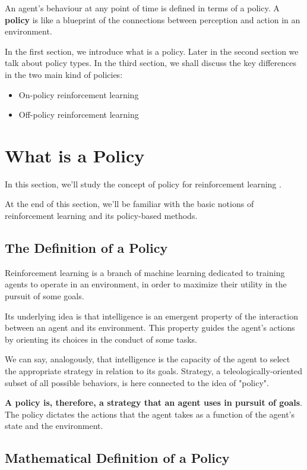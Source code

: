 An agent's behaviour at any point of time is defined in terms 
of a policy. A {\bf policy} is like a blueprint of the connections 
between perception and action in an environment.  

In the first section, we introduce what is a policy.
Later in the second section we talk about policy types.
In the third section, we shall discuss the key differences 
in the two main kind of policies: 
\begin{itemize}
\item On-policy reinforcement learning
\item Off-policy reinforcement learning
\end{itemize}

\section{What is a Policy}

In this section, we'll study the concept of policy for 
reinforcement learning\cite{Gabriele2020}
\parencite{Gabriele2020}
.

At the end of this section, we'll be familiar with the basic 
notions of reinforcement learning and its policy-based methods.

\subsection{The Definition of a Policy}

Reinforcement learning is a branch of machine learning 
dedicated to training agents to operate in an environment, 
in order to maximize their utility in the pursuit of some 
goals.

Its underlying idea is that intelligence is an emergent 
property of the interaction between an agent and its 
environment. This property guides the agent's actions by 
orienting its choices in the conduct of some tasks.

We can say, analogously, that intelligence is the capacity 
of the agent to select the appropriate strategy in relation 
to its goals. Strategy, a teleologically-oriented subset of 
all possible behaviors, is here connected to the idea of 
"policy".

{\bf A policy is, therefore, a strategy that an agent uses 
in pursuit of goals}. The policy dictates the actions that 
the agent takes as a function of the agent's state and the 
environment.

\subsection{Mathematical Definition of a Policy}

